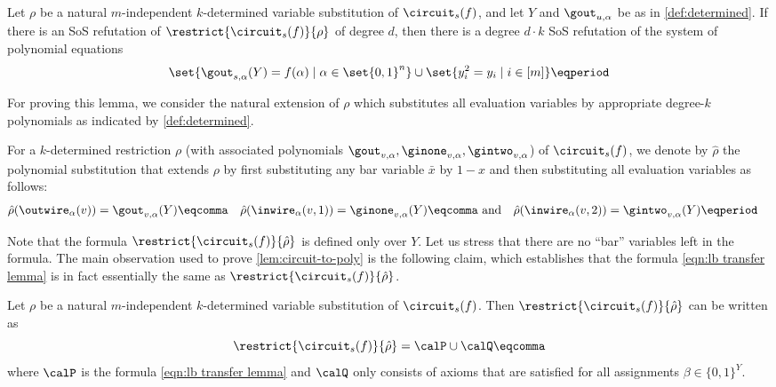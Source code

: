 \begin{lemma}
  \label{lem:circuit-to-poly}
  Let $\rho$ be a natural $m$-independent $k$-determined variable substitution
  of $\circuit_s(f)$, and let $Y$ and
  $\gout_{u, \alpha}$ be as in \cref{def:determined}. If there is an
  SoS refutation of $\restrict{\circuit_s(f)}{\rho}$ of degree $d$,
  then there is a degree $d \cdot k$ SoS refutation of the system
  of polynomial equations
  \begin{align}
    \label{eqn:lb transfer lemma}
    \set{
      \gout_{s,\alpha}(Y) = f(\alpha) \mid \alpha \in \set{0,1}^n
    }
    \cup
    \set{
      y_i^2 = y_i \mid i \in [m]
    } \eqperiod
  \end{align}
\end{lemma}


For proving this lemma, we consider the natural extension of $\rho$
which substitutes all evaluation variables by appropriate
degree-$k$ polynomials as indicated by \cref{def:determined}.

\begin{definition}
  For a $k$-determined restriction $\rho$ (with associated polynomials
  $\gout_{v,\alpha}, \ginone_{v,\alpha}, \gintwo_{v,\alpha}$) of
  $\circuit_s(f)$, we denote by $\hat\rho$ the polynomial substitution
  that extends $\rho$ by first substituting any bar variable $\bar x$
  by $1 - x$ and then substituting all evaluation variables as
  follows:
  \begin{align*}
    \hat\rho(\outwire_\alpha(v)) &=
    \gout_{v, \alpha}(Y) \eqcomma &
    \hat\rho(\inwire_\alpha(v, 1)) &= \ginone_{v,
    \alpha}(Y) \eqcomma \text{~and} &
    \hat\rho(\inwire_\alpha(v, 2)) &= \gintwo_{v,
    \alpha}(Y) \eqperiod
  \end{align*}
\end{definition}

Note that the formula $\restrict{\circuit_s(f)}{\hat\rho}$ is
defined only over $Y$. Let us stress that there are no ``bar''
variables left in the formula. The main observation used to prove
\cref{lem:circuit-to-poly} is the following claim, which establishes
that the formula \eqref{eqn:lb transfer lemma} is in fact essentially
the same as $\restrict{\circuit_s(f)}{\hat\rho}$.

\begin{claim}
  \label{claim:tau-rho}
  Let $\rho$ be a natural $m$-independent $k$-determined variable substitution
  of $\circuit_s(f)$.  Then
  $\restrict{\circuit_s(f)}{\hat\rho}$ can be written as
  $$
  \restrict{\circuit_s(f)}{\hat\rho} = \calP \cup \calQ \eqcomma
  $$
  where $\calP$ is the formula \eqref{eqn:lb transfer lemma} and
  $\calQ$ only consists of axioms that are satisfied for all
  assignments $\beta \in \{0,1\}^Y$.
\end{claim}

